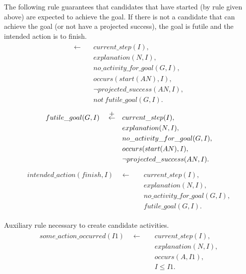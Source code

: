 \documentclass[11pt, oneside]{article}
\begin{document}
The following rule guarantees that candidates that have started (by rule given above) are expected to achieve the goal. If there is not a candidate that can achieve the goal (or not have a projected success), the goal is futile and the intended action is to finish. 
\begin{align}\begin{split}				   
\leftarrow \quad &current\_step(I),\\
&explanation(N,I),\\
&no\_activity\_for\_goal(G,I),\\
&occurs(start(AN),I),\\
&\neg projected\_success(AN,I),\\
&not\ futile\_goal(G,I).
\end{split}\end{align}
\begin{align}\begin{split}
futile\_goal(G,I)\quad \stackrel{\mathclap{\normalfont\mbox{+}}}{\leftarrow}  \quad  &current\_step(I),\\
&explanation(N,I),\\
	&no\_activity\_for\_goal(G,I),\\
	&occurs(start(AN),I),\\
	&\neg projected\_success(AN,I).
		\end{split}\end{align}
\begin{align}\begin{split}
intended\_action(finish,I) \quad \leftarrow \quad &current\_step(I),\\
&explanation(N,I),\\
	&no\_activity\_for\_goal(G,I),\\
	&futile\_goal(G,I).
\end{split}\end{align}

Auxiliary rule necessary to create candidate activities.
\begin{align}\begin{split}
some\_action\_occurred(I1) \quad \leftarrow \quad &current\_step(I),\\
&explanation(N,I),\\
&occurs(A,I1),\\
&I\leq I1.
\end{split}\end{align}
\end{document}

